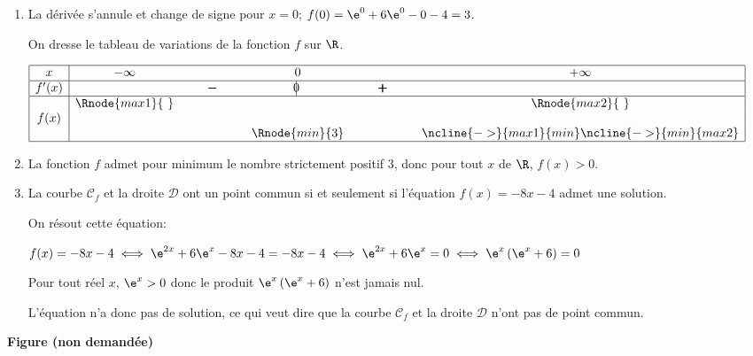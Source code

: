 \begin{enumerate}
\item La dérivée s'annule et change de signe pour $x=0$; $f(0) = \e^{0} + 6\e^{0} -0 -4 = 3$.

On dresse le tableau de variations de la fonction $f$ sur $\R$.

\begin{center}
{\renewcommand{\arraystretch}{1.3}
\def\esp{\hspace*{1.5cm}}
\def\hauteur{0pt}
$\begin{array}{|c| *4{c} c|}
\hline
 x & -\infty & \esp & 0 & \esp & +\infty \\
 \hline
f'(x) &  &  \pmb{-} & \vline\hspace{-2.7pt}0 & \pmb{+} & \\  
\hline
  & \Rnode{max1}{~}  &  &  &  & \Rnode{max2}{~}   \\
f(x) & &  & & &  \rule{0pt}{\hauteur} \\
 &  & &   \Rnode{min}{3} & & \rule{0pt}{\hauteur}
\ncline{->}{max1}{min} \ncline{->}{min}{max2}\\
\hline
\end{array}$
}
\end{center}

\item 
La fonction $f$ admet pour minimum le nombre strictement positif 3, donc pour tout $x$ de $\R$, $f(x)>0$.

\item La courbe $\mathcal{C}_f$ et la droite $\mathcal{D}$ ont un point commun si et seulement si l'équation $f(x)=-8x-4$ admet une solution.

On résout cette équation:

$f(x)=-8x-4
\iff
\e^{2x} + 6 \e^{x} - 8x-4 = -8x-4
\iff
\e^{2x} + 6 \e^{x} = 0
\iff
\e^{x} \left (\e^{x}+6\right ) = 0$

Pour tout réel $x$, $\e^{x}>0$ donc le produit $\e^{x} \left (\e^{x}+6\right )$ n'est jamais nul.

L'équation n'a donc pas de solution, ce qui veut dire que la courbe $\mathcal{C}_f$ et la droite $\mathcal{D}$ n'ont pas de point commun.



\end{enumerate}


\begin{center}
\large \textbf{Figure (non demandée)}
\end{center}

\bigskip

